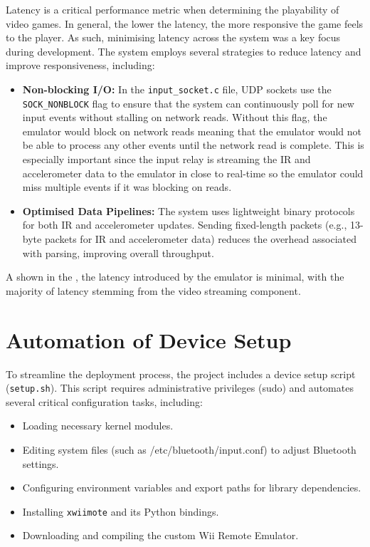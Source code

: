 Latency is a critical performance metric when determining the playability of video games. In general, the lower the latency, the more responsive the game feels to the player. As such, minimising latency across the system was a key focus during development. The system employs several strategies to reduce latency and improve responsiveness, including:

\begin{itemize}
	\item \textbf{Non-blocking I/O:} In the \texttt{input\_socket.c} file, UDP
	      sockets use the \linebreak \texttt{SOCK\_NONBLOCK} flag to ensure that the system
	      can continuously poll for new input events without stalling on network reads.
	      Without this flag, the emulator would block on network reads meaning that the
	      emulator would not be able to process any other events until the network read is
	      complete. This is especially important since the input relay is streaming the IR
	      and accelerometer data to the emulator in close to real-time so the emulator
	      could miss multiple events if it was blocking on reads.
	\item \textbf{Optimised Data Pipelines:} The system uses lightweight binary
	      protocols for both IR and accelerometer updates. Sending fixed-length packets
	      (e.g., 13-byte packets for IR and accelerometer data) reduces the overhead associated
	      with parsing, improving overall throughput.

\end{itemize}

A shown in the , the latency introduced by the emulator is minimal, with the majority of latency stemming from the video streaming component.

\section{Automation of Device Setup}

To streamline the deployment process, the project includes a device setup script (\texttt{setup.sh}). This script requires administrative privileges (sudo) and automates several critical configuration tasks, including:

\begin{itemize}

	\item Loading necessary kernel modules.
	\item Editing system files (such as /etc/bluetooth/input.conf) to adjust Bluetooth settings.
	\item Configuring environment variables and export paths for library dependencies.
	\item Installing \texttt{xwiimote} and its Python bindings.
	\item Downloading and compiling the custom Wii Remote Emulator.
\end{itemize}

